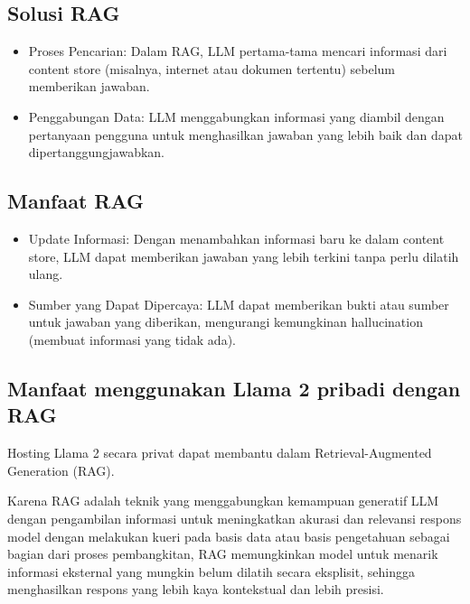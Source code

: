 \documentclass{article}
\begin{document}
\subsection{Solusi RAG}
\begin{itemize}
    \item Proses Pencarian: Dalam RAG, LLM pertama-tama mencari informasi dari content store (misalnya, internet atau dokumen tertentu) sebelum memberikan jawaban.
    \item Penggabungan Data: LLM menggabungkan informasi yang diambil dengan pertanyaan pengguna untuk menghasilkan jawaban yang lebih baik dan dapat dipertanggungjawabkan.
\end{itemize}

\subsection{Manfaat RAG}
\begin{itemize}
    \item Update Informasi: Dengan menambahkan informasi baru ke dalam content store, LLM dapat memberikan jawaban yang lebih terkini tanpa perlu dilatih ulang.
    \item Sumber yang Dapat Dipercaya: LLM dapat memberikan bukti atau sumber untuk jawaban yang diberikan, mengurangi kemungkinan hallucination (membuat informasi yang tidak ada).
\end{itemize}

\subsection{Manfaat menggunakan Llama 2 pribadi dengan RAG}
Hosting Llama 2 secara privat dapat membantu dalam Retrieval-Augmented Generation (RAG).

Karena RAG adalah teknik yang menggabungkan kemampuan generatif LLM dengan pengambilan informasi untuk meningkatkan akurasi dan relevansi respons model dengan melakukan kueri pada basis data atau basis pengetahuan sebagai bagian dari proses pembangkitan, RAG memungkinkan model untuk menarik informasi eksternal yang mungkin belum dilatih secara eksplisit, sehingga menghasilkan respons yang lebih kaya kontekstual dan lebih presisi.
\end{document}
